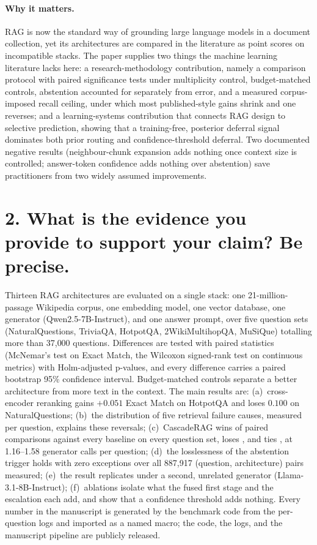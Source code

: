 \documentclass[10pt,a4paper]{article}
\begin{document}
\paragraph{Why it matters.} RAG is now the standard way of grounding large
language models in a document collection, yet its architectures are
compared in the literature as point scores on incompatible stacks. The
paper supplies two things the machine learning literature lacks here: a
research-methodology contribution, namely a comparison protocol with
paired significance tests under multiplicity control, budget-matched
controls, abstention accounted for separately from error, and a measured
corpus-imposed recall ceiling, under which most published-style gains
shrink and one reverses; and a learning-systems contribution that connects
RAG design to selective prediction, showing that a training-free,
posterior deferral signal dominates both prior routing and
confidence-threshold deferral. Two documented negative results
(neighbour-chunk expansion adds nothing once context size is controlled;
answer-token confidence adds nothing over abstention) save practitioners
from two widely assumed improvements.

\section*{2. What is the evidence you provide to support your claim? Be
precise.}

Thirteen RAG architectures are evaluated on a single stack: one
21-million-passage Wikipedia corpus, one embedding model, one vector
database, one generator (Qwen2.5-7B-Instruct), and one answer prompt,
over five question sets (NaturalQuestions, TriviaQA, HotpotQA,
2WikiMultihopQA, MuSiQue) totalling more than 37{,}000 questions.
Differences are tested with paired statistics (McNemar's test on Exact
Match, the Wilcoxon signed-rank test on continuous metrics) with
Holm-adjusted p-values, and every difference carries a paired bootstrap
95\% confidence interval. Budget-matched controls separate a better
architecture from more text in the context. The main results are:
(a)~cross-encoder reranking gains $+0.051$ Exact Match on HotpotQA and
loses $0.100$ on NaturalQuestions; (b)~the distribution of five retrieval
failure causes, measured per question, explains these reversals;
(c)~CascadeRAG wins \ResultWins{} of \ResultPairs{} paired comparisons
against every baseline on every question set, loses \ResultLosses{}, and
ties \ResultTies{}, at 1.16--1.58 generator calls per question;
(d)~the losslessness of the abstention trigger holds with zero exceptions
over all 887{,}917 (question, architecture) pairs measured; (e)~the result
replicates under a second, unrelated generator (Llama-3.1-8B-Instruct);
(f)~ablations isolate what the fused first stage and the escalation each
add, and show that a confidence threshold adds nothing. Every number in
the manuscript is generated by the benchmark code from the per-question
logs and imported as a named macro; the code, the logs, and the manuscript
pipeline are publicly released.
\end{document}
